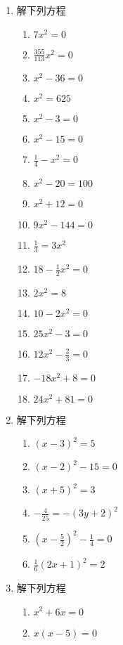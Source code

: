 \begin{enumerate}
    \item 解下列方程
\begin{multicols}{2}
\begin{enumerate}
    \item  $7 x^{2}=0$
    \item  $\frac{355}{113} x^{2}=0$
    \item  $x^{2}-36=0$
    \item  $x^{2}=625$
    \item  $x^{2}-3=0$
    \item  $x^{2}-15=0$
    \item  $\frac{1}{4}-x^{2}=0$ 
    \item  $x^{2}-20=100$
    \item  $x^{2}+12=0$
    \item  $9 x^{2}-144=0$
    \item  $\frac{1}{3}=3 x^{2}$
    \item $18-\frac{1}{2} x^{2}=0$
    \item  $2 x^{2}=8$
    \item  $10-2 x^{2}=0$
    \item  $25 x^{2}-3=0$
    \item  $12 x^{2}-\frac{2}{3}=0$
    \item  $-18 x^{2}+8=0$
    \item  $24 x^{2}+81=0$
\end{enumerate}
\end{multicols}
    \item 解下列方程
    \begin{multicols}{2}
        \begin{enumerate}
\item  $(x-3)^{2}=5$
    \item $(x-2)^{2}-15=0$
    \item  $(x+5)^{2}=3$
    \item  $-\frac{4}{25}=-(3 y+2)^{2}$
    \item  $\left(x-\frac{5}{2}\right)^{2}-\frac{1}{4}=0$
    \item  $ \frac{1}{6}(2 x+1)^{2}=2$
        \end{enumerate}
    \end{multicols}
    \item 解下列方程
    \begin{multicols}{2}
        \begin{enumerate}
    \item $x^{2}+6 x=0$
    \item $x(x-5)=0$

\end{enumerate}
\end{multicols}
\end{enumerate}
